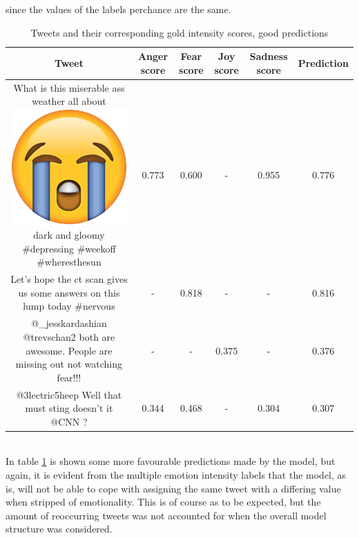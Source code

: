  since the values of the labels perchance are the same.\\
\begin{table}[h]
\begin{tabular}{c|c|c|c|c|c|}
Tweet & Anger score & Fear score & Joy score & Sadness score & Prediction  \\ \hline
\parbox[t]{6cm}{What is this miserable ass weather all about \includegraphics[scale=0.015]{pictures/loudly_crying_face_emoji.png} dark and gloomy \#depressing \#weekoff \#wheresthesun} & 0.773 & 0.600 & - & 0.955 & 0.776\\ \hline
\parbox[t]{6cm}{Let's hope the ct scan gives us some answers on this lump today \#nervous} & - & 0.818 & - & - & 0.816\\ \hline
\parbox[t]{6cm}{@\_jesskardashian @trevschan2 both are awesome.  People are missing out not watching fear!!!} & - & - & 0.375 & - & 0.376\\ \hline
\parbox[t]{6cm}{@3lectric5heep Well that must sting doesn't it @CNN ?} & 0.344 & 0.468 & - & 0.304 & 0.307
\end{tabular}
\caption{Tweets and their corresponding gold intensity scores, good predictions}
\label{tab:regerrorlow}
\end{table}\\
In table \ref{tab:regerrorlow} is shown some more favourable predictions made by the model, but again, it is evident from the multiple emotion intensity labels that the model, as is, will not be able to cope with assigning the same tweet with a differing value when stripped of emotionality. This is of course as to be expected, but the amount of reoccurring tweets was not accounted for when the overall model structure was considered.

